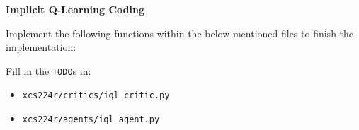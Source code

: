 \item {} \noindent \textbf{Implicit Q-Learning Coding} 

Implement the following functions within the below-mentioned files to finish the implementation: 

Fill in the \texttt{TODO}s in:
\begin{itemize}
    \item \texttt{xcs224r/critics/iql\_critic.py}
    \item \texttt{xcs224r/agents/iql\_agent.py}
\end{itemize}
